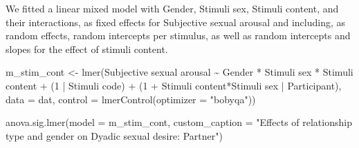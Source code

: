 \documentclass[
  bookmarksnumbered]{article}
\newenvironment{Shaded}{\begin{snugshade}}{\end{snugshade}}
\newcommand{\AttributeTok}[1]{\textcolor[rgb]{0.80,0.80,0.80}{#1}}
\newcommand{\DecValTok}[1]{\textcolor[rgb]{0.86,0.86,0.80}{#1}}
\newcommand{\FunctionTok}[1]{\textcolor[rgb]{0.94,0.94,0.56}{#1}}
\newcommand{\NormalTok}[1]{\textcolor[rgb]{0.80,0.80,0.80}{#1}}
\newcommand{\OtherTok}[1]{\textcolor[rgb]{0.94,0.94,0.56}{#1}}
\newcommand{\SpecialCharTok}[1]{\textcolor[rgb]{0.86,0.64,0.64}{#1}}
\newcommand{\StringTok}[1]{\textcolor[rgb]{0.80,0.58,0.58}{#1}}
\begin{document}
We fitted a linear mixed model with Gender, Stimuli sex, Stimuli content, and their interactions, as fixed effects for Subjective sexual arousal and including, as random effects, random intercepts per stimulus, as well as random intercepts and slopes for the effect of stimuli content.

\begin{Shaded}
\begin{Highlighting}[]
\NormalTok{m\_stim\_cont }\OtherTok{\textless{}{-}} \FunctionTok{lmer}\NormalTok{(}\StringTok{\textasciigrave{}}\AttributeTok{Subjective sexual arousal}\StringTok{\textasciigrave{}} \SpecialCharTok{\textasciitilde{}} 
\NormalTok{             Gender }\SpecialCharTok{*} \StringTok{\textasciigrave{}}\AttributeTok{Stimuli sex}\StringTok{\textasciigrave{}} \SpecialCharTok{*} \StringTok{\textasciigrave{}}\AttributeTok{Stimuli content}\StringTok{\textasciigrave{}} \SpecialCharTok{+}
\NormalTok{             (}\DecValTok{1} \SpecialCharTok{|} \StringTok{\textasciigrave{}}\AttributeTok{Stimuli code}\StringTok{\textasciigrave{}}\NormalTok{) }\SpecialCharTok{+}
\NormalTok{             (}\DecValTok{1} \SpecialCharTok{+} \StringTok{\textasciigrave{}}\AttributeTok{Stimuli content}\StringTok{\textasciigrave{}}\SpecialCharTok{*}\StringTok{\textasciigrave{}}\AttributeTok{Stimuli sex}\StringTok{\textasciigrave{}} \SpecialCharTok{|}\NormalTok{ Participant),}
           \AttributeTok{data =}\NormalTok{ dat,}
           \AttributeTok{control =} \FunctionTok{lmerControl}\NormalTok{(}\AttributeTok{optimizer =} \StringTok{"bobyqa"}\NormalTok{))}

\FunctionTok{anova.sig.lmer}\NormalTok{(}\AttributeTok{model =}\NormalTok{ m\_stim\_cont, }
               \AttributeTok{custom\_caption =} \StringTok{"Effects of relationship type and gender }
\StringTok{               on Dyadic sexual desire: Partner"}\NormalTok{)}
\end{Highlighting}
\end{Shaded}
\end{document}
